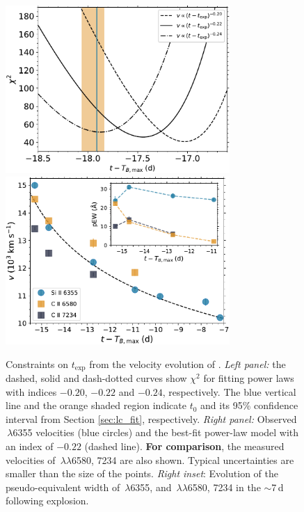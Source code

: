 \documentclass[twocolumn]{aastex61}
\begin{document}
\begin{figure}[!thb]
  \centering
  \includegraphics[width=3.35in]{Chi2.pdf}
  \includegraphics[width=3.35in]{VelocityPlot.pdf}
  \caption{
  Constraints on $t_\mathrm{exp}$ from the velocity evolution of .
  \textit{Left panel:} the dashed, solid and dash-dotted curves show $\chi^2$
  for fitting power laws with indices $-0.20$, $-0.22$ and $-0.24$,
  respectively. The blue vertical line and the orange shaded region indicate
  $t_0$ and its 95\% confidence interval from Section \ref{sec:lc_fit},
  respectively. \textit{Right panel:} Observed \,$\lambda$6355
  velocities (blue circles) and the best-fit power-law model with an index of
  $-0.22$ (dashed line). \textbf{For comparison}, the measured velocities of
  \,$\lambda\lambda$6580, 7234 are also shown. Typical uncertainties
  are smaller than the size of the points. \textit{Right inset}: Evolution of
  the pseudo-equivalent width of \,$\lambda$6355, and
  \,$\lambda\lambda$6580, 7234 in the $\sim$7\,d following 
  explosion.}
  \label{fig:velocity_t_exp}
\end{figure}
\end{document}

